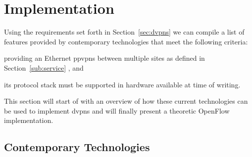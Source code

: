 \section{Implementation} %
\label{sec:implementation}

Using the requirements set forth in Section~\ref{sec:dvpns} we can compile a list of features provided by contemporary technologies that meet the following criteria:
\begin{inparaenum}[\itshape 1\upshape)]
	\item providing an Ethernet \acp{ppvpn} between multiple sites as defined in Section~\ref{sub:service} , and
	\item its protocol stack must be supported in hardware available at time of writing.
	\label{lst:num}
\end{inparaenum}
This section will start of with an overview of how these current technologies can be used to implement \acp{dvpn} and will finally present a theoretic OpenFlow implementation.


\subsection{Contemporary Technologies} %
\label{sub:contemporary_technologies}

%

